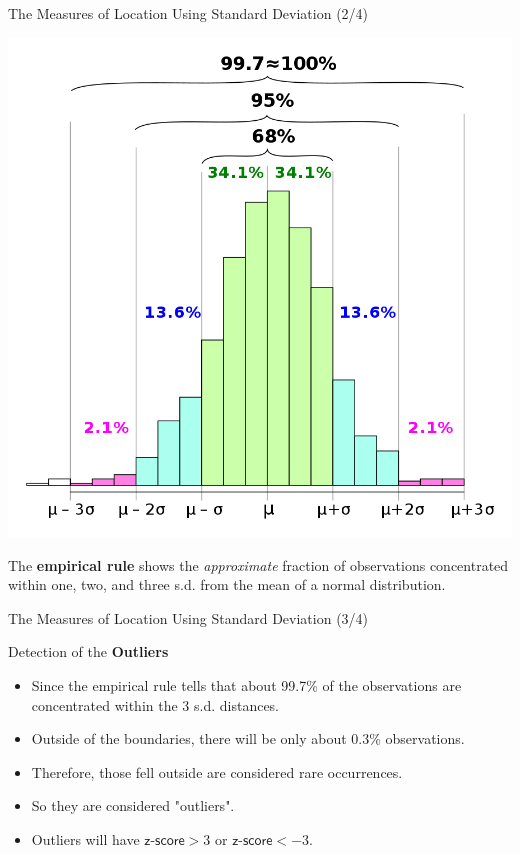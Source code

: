 \documentclass{beamer}
\begin{document}
\begin{frame}{The Measures of Location Using Standard Deviation (2/4)}

\begin{center}
\includegraphics[scale=0.18]{images/ch2EmpiricalRule.png}
\end{center}

The \textbf{empirical rule} shows the \textit{approximate} fraction of observations concentrated within one, two, and three s.d. from the mean of a normal distribution.

\end{frame}

\begin{frame}{The Measures of Location Using Standard Deviation (3/4)}

Detection of the \textbf{Outliers}

\begin{itemize}
\item Since the empirical rule tells that about 99.7\% of the observations are concentrated within the 3 s.d. distances.
\item Outside of the boundaries, there will be only about 0.3\% observations.
\item Therefore, those fell outside are considered rare occurrences.
\item So they are considered "outliers".
\item Outliers will have $\textsf{z-score} > 3$ or $\textsf{z-score} < -3$. 
\end{itemize}

\end{frame}
\end{document}
